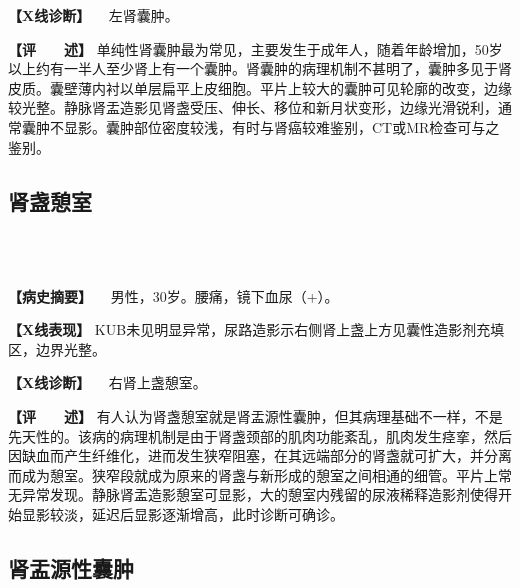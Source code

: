 \textbf{【X线诊断】} 　左肾囊肿。

\textbf{【评　　述】}
单纯性肾囊肿最为常见，主要发生于成年人，随着年龄增加，50岁以上约有一半人至少肾上有一个囊肿。肾囊肿的病理机制不甚明了，囊肿多见于肾皮质。囊壁薄内衬以单层扁平上皮细胞。平片上较大的囊肿可见轮廓的改变，边缘较光整。静脉肾盂造影见肾盏受压、伸长、移位和新月状变形，边缘光滑锐利，通常囊肿不显影。囊肿部位密度较浅，有时与肾癌较难鉴别，CT或MR检查可与之鉴别。

\subsection{肾盏憩室}

\begin{figure}
    \centering
    \\
    \\
    \caption{}
    \label{fig6-6-3}
\end{figure}

\textbf{【病史摘要】} 　男性，30岁。腰痛，镜下血尿（+）。

\textbf{【X线表现】}
KUB未见明显异常，尿路造影示右侧肾上盏上方见囊性造影剂充填区，边界光整。

\textbf{【X线诊断】} 　右肾上盏憩室。

\textbf{【评　　述】}
有人认为肾盏憩室就是肾盂源性囊肿，但其病理基础不一样，不是先天性的。该病的病理机制是由于肾盏颈部的肌肉功能紊乱，肌肉发生痉挛，然后因缺血而产生纤维化，进而发生狭窄阻塞，在其远端部分的肾盏就可扩大，并分离而成为憩室。狭窄段就成为原来的肾盏与新形成的憩室之间相通的细管。平片上常无异常发现。静脉肾盂造影憩室可显影，大的憩室内残留的尿液稀释造影剂使得开始显影较淡，延迟后显影逐渐增高，此时诊断可确诊。

\subsection{肾盂源性囊肿}

